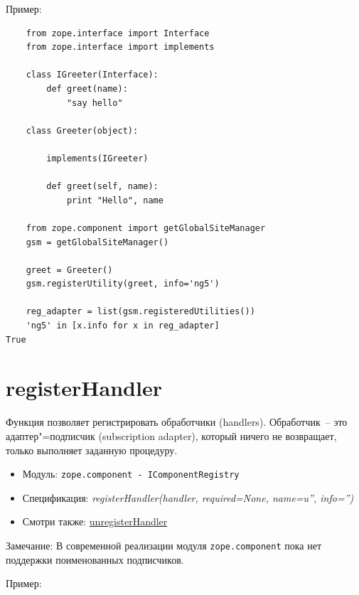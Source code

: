 \documentclass[a4paper,openany,twoside,final]{book}
\providecommand*{\DUroletitlereference}[1]{\textsl{#1}}
\begin{document}
Пример:

\begin{verbatim}
    from zope.interface import Interface
    from zope.interface import implements

    class IGreeter(Interface):
        def greet(name):
            "say hello"

    class Greeter(object):

        implements(IGreeter)

        def greet(self, name):
            print "Hello", name

    from zope.component import getGlobalSiteManager
    gsm = getGlobalSiteManager()

    greet = Greeter()
    gsm.registerUtility(greet, info='ng5')

    reg_adapter = list(gsm.registeredUtilities())
    'ng5' in [x.info for x in reg_adapter]
True
\end{verbatim}


\section*{registerHandler%
  \label{registerhandler}%
}

Функция позволяет регистрировать обработчики (handlers). Обработчик~-- это адаптер"=подписчик (subscription adapter), который ничего не возвращает, только выполняет заданную процедуру.

\begin{itemize}

\item Модуль: \texttt{zope.component - IComponentRegistry}

\item Спецификация: \DUroletitlereference{registerHandler(handler, required=None, name=u'', info='')}

\item Смотри также: \hyperref[unregisterhandler]{unregisterHandler}

\end{itemize}

Замечание: В современной реализации модуля \texttt{zope.component} пока нет поддержки поименованных подписчиков.

Пример:
\end{document}
